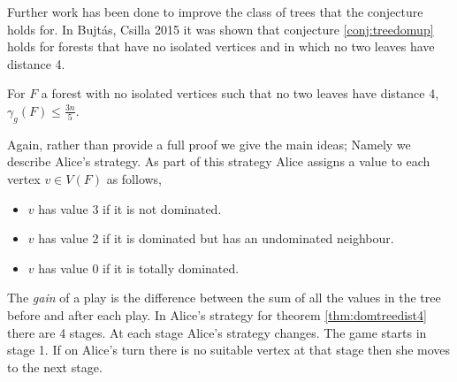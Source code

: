 %    
%    
Further work has been done to improve the class of trees that the conjecture holds for. In Bujt\'{a}s, Csilla 2015 \cite{Bujt2015} it was shown that conjecture \ref{conj:treedomup} holds for forests that have no isolated vertices and in which no two leaves have distance 4.
%
\begin{theorem}\label{thm:domtreedist4}
    For $F$ a forest with no isolated vertices such that no two leaves have distance 4,
    $\gamma_g(F)\leq \frac{3n}{5}$.
\end{theorem}
Again, rather than provide a full proof we give the main ideas; Namely we describe Alice's strategy. As part of this strategy Alice assigns a value to each vertex $v\in V(F)$ as follows, 
\begin{itemize}
    \item $v$ has value 3 if it is not dominated.
    \item $v$ has value 2 if it is dominated but has an undominated neighbour.
    \item $v$ has value 0 if it is totally dominated.
\end{itemize}
The \textit{gain} of a play is the difference between the sum of all the values in the tree before and after each play. In Alice's strategy for theorem \ref{thm:domtreedist4} there are 4 stages. At each stage Alice's strategy changes. The game starts in stage 1. If on Alice's turn there is no suitable vertex at that stage then she moves to the next stage. 
